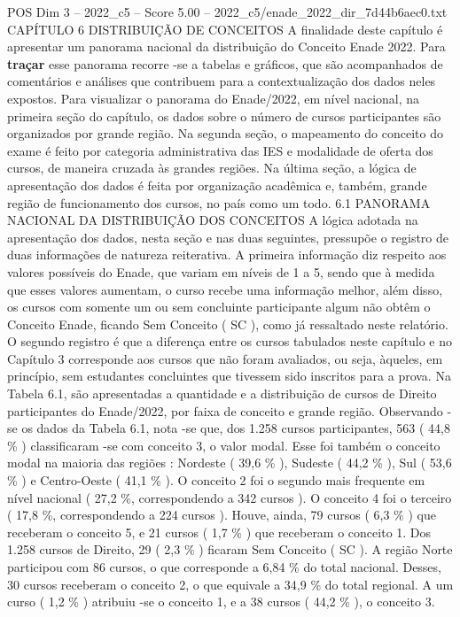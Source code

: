 \begin{textsample}{POS Dim 3 – 2022\_c5 – Score 5.00 – 2022\_c5/enade\_2022\_dir\_7d44b6aec0.txt}
CAPÍTULO 6 DISTRIBUIÇÃO DE CONCEITOS A finalidade deste capítulo é apresentar um panorama nacional da distribuição do Conceito Enade 2022.
Para \textbf{traçar} esse panorama recorre -se a tabelas e gráficos, que são acompanhados de comentários e análises que contribuem para a contextualização dos dados neles expostos.
Para visualizar o panorama do Enade/2022, em nível nacional, na primeira seção do capítulo, os dados sobre o número de cursos participantes são organizados por grande região.
Na segunda seção, o mapeamento do conceito do exame é feito por categoria administrativa das IES e modalidade de oferta dos cursos, de maneira cruzada às grandes regiões.
Na última seção, a lógica de apresentação dos dados é feita por organização acadêmica e, também, grande região de funcionamento dos cursos, no país como um todo. 6.1 PANORAMA NACIONAL DA DISTRIBUIÇÃO DOS CONCEITOS A lógica adotada na apresentação dos dados, nesta seção e nas duas seguintes, pressupõe o registro de duas informações de natureza reiterativa.
A primeira informação diz respeito aos valores possíveis do Enade, que variam em níveis de 1 a 5, sendo que à medida que esses valores aumentam, o curso recebe uma informação melhor, além disso, os cursos com somente um ou sem concluinte participante algum não obtêm o Conceito Enade, ficando Sem Conceito ( SC ), como já ressaltado neste relatório.
O segundo registro é que a diferença entre os cursos tabulados neste capítulo e no Capítulo 3 corresponde aos cursos que não foram avaliados, ou seja, àqueles, em princípio, sem estudantes concluintes que tivessem sido inscritos para a prova.
Na Tabela 6.1, são apresentadas a quantidade e a distribuição de cursos de Direito participantes do Enade/2022, por faixa de conceito e grande região.
Observando -se os dados da Tabela 6.1, nota -se que, dos 1.258 cursos participantes, 563 ( 44,8 \% ) classificaram -se com conceito 3, o valor modal.
Esse foi também o conceito modal na maioria das regiões : Nordeste ( 39,6 \% ), Sudeste ( 44,2 \% ), Sul ( 53,6 \% ) e Centro-Oeste ( 41,1 \% ).
O conceito 2 foi o segundo mais frequente em nível nacional ( 27,2 \%, correspondendo a 342 cursos ).
O conceito 4 foi o terceiro ( 17,8 \%, correspondendo a 224 cursos ).
Houve, ainda, 79 cursos ( 6,3 \% ) que receberam o conceito 5, e 21 cursos ( 1,7 \% ) que receberam o conceito 1.
Dos 1.258 cursos de Direito, 29 ( 2,3 \% ) ficaram Sem Conceito ( SC ).
A região Norte participou com 86 cursos, o que corresponde a 6,84 \% do total nacional.
Desses, 30 cursos receberam o conceito 2, o que equivale a 34,9 \% do total regional.
A um curso ( 1,2 \% ) atribuiu -se o conceito 1, e a 38 cursos ( 44,2 \% ), o conceito 3.

\end{textsample}
